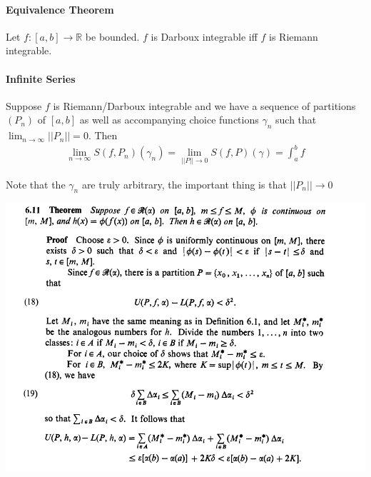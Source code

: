 \documentclass{article}
\begin{document}
\paragraph{Equivalence Theorem}
Let $f:[a,b]\rightarrow \mathbb{R}$ be bounded. $f$ is Darboux integrable iff $f$ is Riemann integrable.

\paragraph{Infinite Series}
Suppose $f$ is Riemann/Darboux integrable and we have a sequence of partitions $(P_n)$ of $[a,b]$ as well as accompanying choice functions $\gamma_n$ such that $\lim_{n\rightarrow \infty}||P_n||=0$.
Then
\begin{align*}
	\lim_{n\rightarrow \infty} S(f, P_n)(\gamma_n) = \lim_{||P||\rightarrow 0} S(f, P)(\gamma) = \int_a^bf
\end{align*}

Note that the $\gamma_n$ are truly arbitrary, the important thing is that $||P_n||\rightarrow 0$


\includegraphics[scale=0.8]{theorem_6_11}
\end{document}
